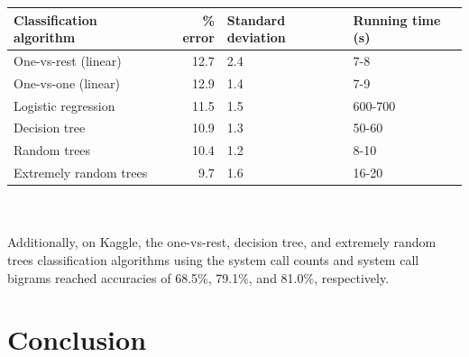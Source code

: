 \documentclass[11pt]{amsart}
\begin{document}
\begin{tabular}{l | r | l | l}
Classification algorithm & \% error & Standard deviation & Running time (s)\\
\hline
One-vs-rest (linear) & 12.7 & 2.4 & 7-8 \\
One-vs-one (linear) & 12.9 & 1.4 & 7-9\\
Logistic regression & 11.5 & 1.5 & 600-700\\
Decision tree & 10.9 & 1.3 & 50-60 \\
Random trees & 10.4 & 1.2 & 8-10\\
Extremely random trees & 9.7 & 1.6 &16-20\\
\end{tabular}
\\
\\
Additionally, on Kaggle, the one-vs-rest, decision tree, and extremely random trees classification algorithms using the system call counts and system call bigrams reached accuracies of 68.5\%, 79.1\%, and 81.0\%, respectively.\\


\section{Conclusion}


\begingroup
\begin{thebibliography}{9}


\end{thebibliography}
\endgroup
\end{document}

